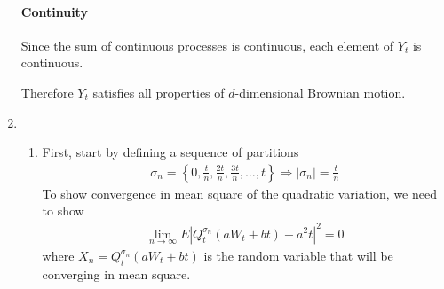 \documentclass[12pt]{article}
\theoremstyle{plain}
\theoremstyle{definition}
\theoremstyle{remark}
\begin{document}
\begin{enumerate}
    \paragraph{Continuity}
    Since the sum of continuous processes is continuous, each element of
    $Y_t$ is continuous.

    Therefore $Y_t$ satisfies all properties of $d$-dimensional Brownian
    motion.

  \item %
    \begin{enumerate}
      \item %
        First, start by defining a sequence of partitions
        \begin{align*}
          \sigma_n =
          \left\{0,\frac{t}{n},\frac{2t}{n},\frac{3t}{n},\ldots,t\right\}
          \Rightarrow |\sigma_n| = \frac{t}{n}
        \end{align*}
        To show convergence in mean square of the quadratic variation,
        we need to show
        \begin{align*}
          \lim_{n\rightarrow \infty}
          E|Q^{\sigma_n}_t(aW_t + bt) - a^2 t|^2 = 0
        \end{align*}
        where $X_n = Q^{\sigma_n}_t(aW_t + bt)$ is the random variable
        that will be converging in mean square.


\end{enumerate}
\end{enumerate}
\end{document}
